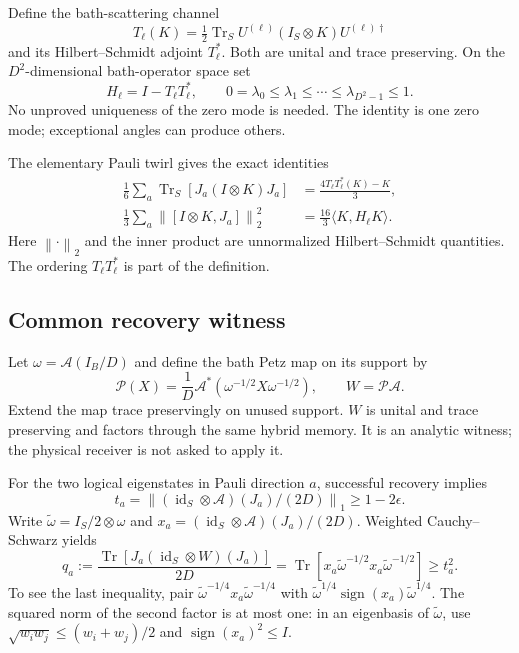 \documentclass[11pt]{article}
\newcommand{\Tr}{\operatorname{Tr}}
\newcommand{\id}{\operatorname{id}}
\newcommand{\norm}[1]{\left\lVert#1\right\rVert}
\begin{document}
Define the bath-scattering channel
\[
 T_\ell(K)=\tfrac12\Tr_S U^{(\ell)}(I_S\otimes K)U^{(\ell)\dagger}
\]
and its Hilbert--Schmidt adjoint $T_\ell^*$. Both are unital and trace preserving.
On the $D^2$-dimensional bath-operator space set
\begin{equation}
 H_\ell=I-T_\ell T_\ell^*,\qquad
 0=\lambda_0\le\lambda_1\le\cdots\le\lambda_{D^2-1}\le1.
 \label{eq:H}
\end{equation}
No unproved uniqueness of the zero mode is needed. The identity is one zero
mode; exceptional angles can produce others.

The elementary Pauli twirl gives the exact identities
\begin{align}
 \frac16\sum_a\Tr_S[J_a(I\otimes K)J_a]
   &=\frac{4T_\ell T_\ell^*(K)-K}{3},\\
 \frac13\sum_a\norm{[I\otimes K,J_a]}_2^2
   &=\frac{16}{3}\langle K,H_\ell K\rangle.
 \label{eq:dirichlet}
\end{align}
Here $\norm{\cdot}_2$ and the inner product are unnormalized Hilbert--Schmidt
quantities. The ordering $T_\ell T_\ell^*$ is part of the definition.

\subsection{Common recovery witness}

Let $\omega=\mathcal A(I_B/D)$ and define the bath Petz map on its support by
\[
 \mathcal P(X)=\frac1D\mathcal A^*(\omega^{-1/2}X\omega^{-1/2}),
 \qquad W=\mathcal P\mathcal A.
\]
Extend the map trace preservingly on unused support. $W$ is unital and trace
preserving and factors through the same hybrid memory. It is an analytic
witness; the physical receiver is not asked to apply it.

For the two logical eigenstates in Pauli direction $a$, successful recovery
implies
\[
 t_a=\norm{(\id_S\otimes\mathcal A)(J_a)/(2D)}_1\ge1-2\epsilon.
\]
Write $\widetilde\omega=I_S/2\otimes\omega$ and
$x_a=(\id_S\otimes\mathcal A)(J_a)/(2D)$. Weighted Cauchy--Schwarz yields
\begin{equation}
 q_a:=\frac{\Tr[J_a(\id_S\otimes W)(J_a)]}{2D}
 =\Tr[x_a\widetilde\omega^{-1/2}x_a\widetilde\omega^{-1/2}]
 \ge t_a^2.
 \label{eq:q}
\end{equation}
To see the last inequality, pair
$\widetilde\omega^{-1/4}x_a\widetilde\omega^{-1/4}$ with
$\widetilde\omega^{1/4}\operatorname{sign}(x_a)\widetilde\omega^{1/4}$.
The squared norm of the second factor is at most one: in an eigenbasis of
$\widetilde\omega$, use $\sqrt{w_iw_j}\le(w_i+w_j)/2$ and
$\operatorname{sign}(x_a)^2\le I$.
\end{document}
